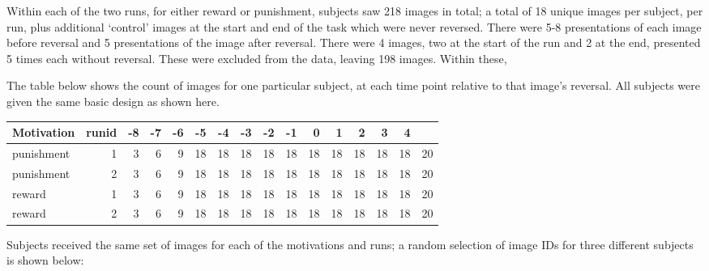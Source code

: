 \documentclass[]{article}
\begin{document}
Within each of the two runs, for either reward or punishment, subjects
saw 218 images in total; a total of 18 unique images per subject, per
run, plus additional `control' images at the start and end of the task
which were never reversed. There were 5-8 presentations of each image
before reversal and 5 presentations of the image after reversal. There
were 4 images, two at the start of the run and 2 at the end, presented 5
times each without reversal. These were excluded from the data, leaving
198 images. Within these,

The table below shows the count of images for one particular subject, at
each time point relative to that image's reversal. All subjects were
given the same basic design as shown here.

\begin{longtable}[]{@{}lrrrrrrrrrrrrrrr@{}}
\toprule
Motivation & runid & -8 & -7 & -6 & -5 & -4 & -3 & -2 & -1 & 0 & 1 & 2 &
3 & 4 &\tabularnewline
\midrule
\endhead
punishment & 1 & 3 & 6 & 9 & 18 & 18 & 18 & 18 & 18 & 18 & 18 & 18 & 18
& 18 & 20\tabularnewline
punishment & 2 & 3 & 6 & 9 & 18 & 18 & 18 & 18 & 18 & 18 & 18 & 18 & 18
& 18 & 20\tabularnewline
reward & 1 & 3 & 6 & 9 & 18 & 18 & 18 & 18 & 18 & 18 & 18 & 18 & 18 & 18
& 20\tabularnewline
reward & 2 & 3 & 6 & 9 & 18 & 18 & 18 & 18 & 18 & 18 & 18 & 18 & 18 & 18
& 20\tabularnewline
\bottomrule
\end{longtable}

Subjects received the same set of images for each of the motivations and
runs; a random selection of image IDs for three different subjects is
shown below:
\end{document}
